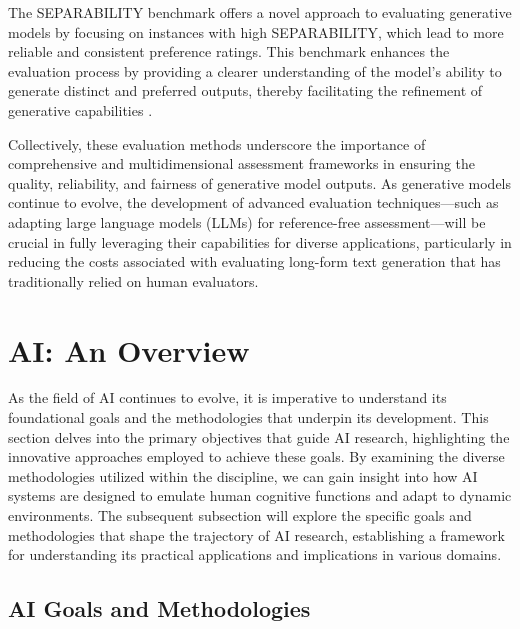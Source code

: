 The SEPARABILITY benchmark offers a novel approach to evaluating generative models by focusing on instances with high SEPARABILITY, which lead to more reliable and consistent preference ratings. This benchmark enhances the evaluation process by providing a clearer understanding of the model's ability to generate distinct and preferred outputs, thereby facilitating the refinement of generative capabilities \cite{ghosh2024comparedespairreliablepreference}.



Collectively, these evaluation methods underscore the importance of comprehensive and multidimensional assessment frameworks in ensuring the quality, reliability, and fairness of generative model outputs. As generative models continue to evolve, the development of advanced evaluation techniques—such as adapting large language models (LLMs) for reference-free assessment—will be crucial in fully leveraging their capabilities for diverse applications, particularly in reducing the costs associated with evaluating long-form text generation that has traditionally relied on human evaluators. \cite{oh2024generativeaiparadoxevaluation}









\section{AI: An Overview} \label{sec:AI: An Overview}

As the field of AI continues to evolve, it is imperative to understand its foundational goals and the methodologies that underpin its development. This section delves into the primary objectives that guide AI research, highlighting the innovative approaches employed to achieve these goals. By examining the diverse methodologies utilized within the discipline, we can gain insight into how AI systems are designed to emulate human cognitive functions and adapt to dynamic environments. The subsequent subsection will explore the specific goals and methodologies that shape the trajectory of AI research, establishing a framework for understanding its practical applications and implications in various domains.





\subsection{AI Goals and Methodologies} \label{subsec:AI Goals and Methodologies}




